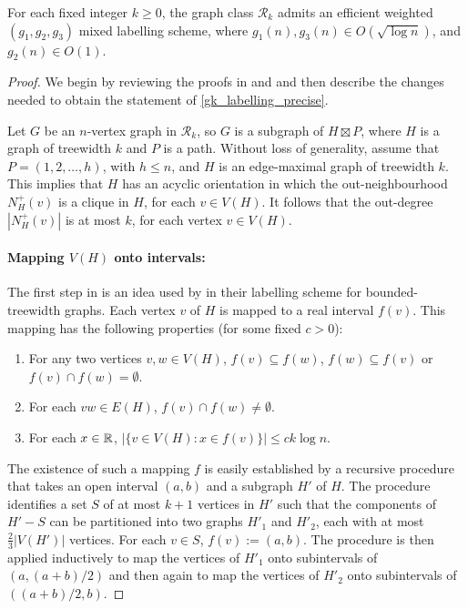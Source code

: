 \documentclass{patmorin}
\renewcommand{\ge}{\geqslant}
\renewcommand{\le}{\leqslant}
\newcommand{\defin}[1]{\emph{\textcolor{brightmaroon}{#1}}}
\newcommand{\Oh}{O}
\newcommand{\calR}{\mathcal{R}}
\begin{document}
\begin{lem}\label{gk_labelling_precise}
  For each fixed integer $k\ge 0$, the graph class $\calR_{k}$ admits an efficient weighted $(g_1,g_2,g_3)$ mixed labelling scheme, where $g_1(n),g_3(n)\in \Oh(\sqrt{\log n})$, and $g_2(n)\in \Oh(1)$.
\end{lem}

\begin{proof}
  We begin by reviewing the proofs in \cite{dujmovic.esperet.ea:adjacency} and \cite{gawrychowski.janczewski:simpler} and then describe the changes needed to obtain the statement of \cref{gk_labelling_precise}.

  Let $G$ be an $n$-vertex graph in $\calR_k$, so $G$ is a subgraph of $H\boxtimes P$, where $H$ is a graph of treewidth $k$ and $P$ is a path. Without loss of generality, assume that $P=(1,2,\dots,h)$, with $h\le n$, and $H$ is an edge-maximal graph of treewidth $k$.  This implies that $H$ has an acyclic orientation in which the out-neighbourhood \defin{$N^+_H(v)$} is a clique in $H$, for each $v\in V(H)$. It follows that the out-degree $|N^+_H(v)|$ is at most $k$, for each vertex $v\in V(H)$.

  \paragraph{\boldmath Mapping $V(H)$ onto intervals:}
  The first step in \cite{dujmovic.esperet.ea:adjacency} is an idea used by \citet{gavoille.labourel:shorter} in their labelling scheme for bounded-treewidth graphs.
  Each vertex $v$ of $H$ is mapped to a real interval \defin{$f(v)$}.
  This mapping has the following properties (for some fixed $c>0$):
  \begin{enumerate}[nosep,label=(I\arabic*)]
    \item\label{nested_or_disjoint} For any two vertices $v,w\in V(H)$, $f(v)\subseteq f(w)$, $f(w)\subseteq f(v)$ or $f(v)\cap f(w)=\emptyset$.
    \item\label{intersection_subgraph} For each $vw\in E(H)$, $f(v)\cap f(w)\neq\emptyset$.
    \item\label{thin} For each $x\in \mathbb{R}$, $|\{v\in V(H):x\in f(v)\}|\le ck\log n$.
  \end{enumerate}

  The existence of such a mapping $f$ is easily established by a recursive procedure that takes an open interval $(a,b)$ and a subgraph $H'$ of $H$.
  The procedure identifies a set $S$ of at most $k+1$ vertices in $H'$ such that the components of $H'-S$ can be partitioned into two graphs $H'_1$ and $H'_2$, each with at most $\tfrac{2}{3}|V(H')|$ vertices.
  For each $v\in S$, $f(v):=(a,b)$.  The procedure is then applied inductively to map the vertices of $H'_1$ onto subintervals of $(a,(a+b)/2)$ and then again to map the vertices of $H'_2$ onto subintervals of $((a+b)/2,b)$.


\end{proof}
\end{document}
